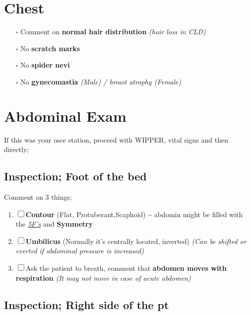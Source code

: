 \documentclass[
  13.5pt,
  a4paper,
  DIV=11,
  numbers=noendperiod]{scrreprt}
\providecommand{\tightlist}{%
  \setlength{\itemsep}{0pt}\setlength{\parskip}{0pt}}
\begin{document}
\section{Chest}\label{chest}

\begin{itemize}
\tightlist
\item[$\square$]
  Comment on \textbf{normal hair distribution} \emph{(hair loss in CLD)}
\item[$\square$]
  No \textbf{scratch marks}
\item[$\square$]
  No \textbf{spider nevi}
\item[$\square$]
  No \textbf{gynecomastia} \emph{(Male) / breast atrophy (Female)}
\end{itemize}

\section{Abdominal Exam}\label{abdominal-exam}

If this was your osce station, proceed with WIPPER, vital signs and then
directly;

\subsection{\texorpdfstring{\textbf{Inspection; Foot of the
bed}}{Inspection; Foot of the bed}}\label{inspection-foot-of-the-bed}

Comment on 3 things;

\begin{enumerate}
\def\labelenumi{\arabic{enumi}.}
\tightlist
\item
  ☐ \textbf{Contour} (Flat, Protuberant,Scaphoid) \textasciitilde{}
  abdomin might be filled with the \href{miscellaneous.qmd}{\emph{5F's}}
  and \textbf{Symmetry}
\item
  ☐ \textbf{Umbilicus} (Normally it's centrally located, inverted)
  \emph{(Can be shifted or everted if abdominal pressure is increased)}
\item
  ☐ Ask the patient to breath, comment that \textbf{abdomen moves with
  respiration} \emph{(It may not move in case of acute abdomen)}
\end{enumerate}

\subsection{\texorpdfstring{\textbf{Inspection; Right side of the
pt}}{Inspection; Right side of the pt}}\label{inspection-right-side-of-the-pt}
\end{document}
